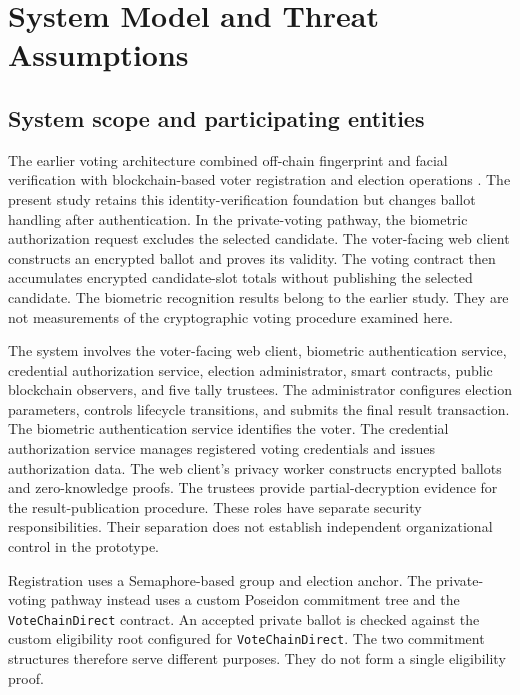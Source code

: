 \section{System Model and Threat Assumptions}
\label{sec:03}
\label{sec:system-model}

\subsection{System scope and participating entities}
\label{subsec:system-entities}

The earlier voting architecture combined off-chain fingerprint and facial
verification with blockchain-based voter registration and election
operations \citep{rifat2026biometric}. The present study retains this
identity-verification foundation but changes ballot handling after
authentication. In the private-voting pathway, the biometric authorization
request excludes the selected candidate. The voter-facing web client
constructs an encrypted ballot and proves its validity. The voting contract
then accumulates encrypted candidate-slot totals without publishing the
selected candidate. The biometric recognition results belong to the earlier
study. They are not measurements of the cryptographic voting procedure
examined here.

The system involves the voter-facing web client, biometric authentication
service, credential authorization service, election administrator, smart
contracts, public blockchain observers, and five tally trustees. The
administrator configures election parameters, controls lifecycle transitions,
and submits the final result transaction. The biometric authentication service
identifies the voter. The credential authorization service manages registered
voting credentials and issues authorization data. The web client's privacy
worker constructs encrypted ballots and zero-knowledge proofs. The trustees
provide partial-decryption evidence for the result-publication procedure.
These roles have separate security responsibilities. Their separation does
not establish independent organizational control in the prototype.

Registration uses a Semaphore-based group and election anchor. The
private-voting pathway instead uses a custom Poseidon commitment tree and
the \texttt{VoteChainDirect} contract. An accepted private ballot is checked
against the custom eligibility root configured for \texttt{VoteChainDirect}.
The two commitment structures therefore serve different purposes. They do
not form a single eligibility proof.

